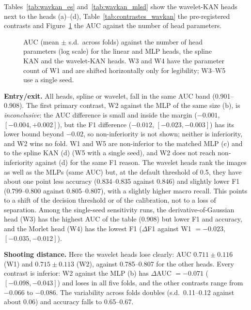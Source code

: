 Tables~\ref{tab:wavkan_es} and~\ref{tab:wavkan_mlsd} show the wavelet-KAN heads next to the heads (a)--(d), Table~\ref{tab:contrastes_wavkan} the pre-registered contrasts and Figure~\ref{fig:auc_parametros} the AUC against the number of head parameters.



\begin{figure}[!htbp]
\centering

\caption{AUC (mean $\pm$ s.d.\ across folds) against the number of head parameters (log scale) for the linear and MLP heads, the spline KAN and the wavelet-KAN heads. W3 and W4 have the parameter count of W1 and are shifted horizontally only for legibility; W3--W5 use a single seed.}
\label{fig:auc_parametros}
\end{figure}

\textbf{Entry/exit.} All heads, spline or wavelet, fall in the same AUC band (0.901--0.908). The first primary contrast, W2 against the MLP of the same size (b), is \emph{inconclusive}: the AUC difference is small and inside the margin ($-0.001$, $[-0.004, +0.002]$), but the F1 difference ($-0.012$, $[-0.023, -0.003]$) has its lower bound beyond $-0.02$, so non-inferiority is not shown; neither is inferiority, and W2 wins no fold. W1 and W5 are non-inferior to the matched MLP (c) and to the spline KAN (d) (W5 with a single seed), and W2 does not reach non-inferiority against (d) for the same F1 reason. The wavelet heads rank the images as well as the MLPs (same AUC) but, at the default threshold of 0.5, they have about one point less accuracy (0.834--0.835 against 0.846) and slightly lower F1 (0.799--0.800 against 0.805--0.807), with a slightly higher macro recall. This points to a shift of the decision threshold or of the calibration, not to a loss of separation. Among the single-seed sensitivity runs, the derivative-of-Gaussian head (W3) has the highest AUC of the table (0.908) but lower F1 and accuracy, and the Morlet head (W4) has the lowest F1 ($\Delta$F1 against W1 $= -0.023$, $[-0.035, -0.012]$).



\textbf{Shooting distance.} Here the wavelet heads lose clearly: AUC $0.711 \pm 0.116$ (W1) and $0.715 \pm 0.113$ (W2), against 0.785--0.807 for the other heads. Every contrast is inferior: W2 against the MLP (b) has $\Delta$AUC $= -0.071$ ($[-0.098, -0.043]$) and loses in all five folds, and the other contrasts range from $-0.066$ to $-0.086$. The variability across folds doubles (s.d.\ 0.11--0.12 against about 0.06) and accuracy falls to 0.65--0.67.

